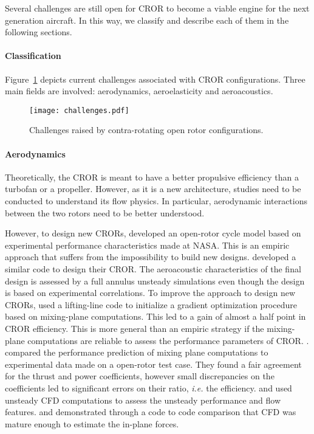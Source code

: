 
Several challenges are still open for CROR
to become a viable engine for the next generation aircraft.
In this way, we classify and describe each of them in the following sections.

\paragraph{Classification}
Figure~\ref{fig:cror_challenges} depicts current challenges associated
with CROR configurations. Three main fields are involved: aerodynamics,
aeroelasticity and aeroacoustics.
\begin{figure}[htbp]
  \centering
  \texttt{[image: challenges.pdf]}
  \caption{Challenges raised by contra-rotating open rotor configurations.}
  \label{fig:cror_challenges}
\end{figure}

\paragraph{Aerodynamics}
Theoretically, 
the CROR is meant to have a better propulsive efficiency than a turbofan or a
propeller. However, as it is a new architecture, studies need to be conducted
to understand its flow physics. In particular,
aerodynamic interactions between the two rotors need to be better understood.

However, to design new CRORs, 
\citet{Hendricks2011} developed an open-rotor cycle model based
on experimental performance characteristics made at NASA. This is 
an empiric approach that suffers from the impossibility to build new designs.
\citet{Peters2012} developed a similar code to design their CROR. The aeroacoustic
characteristics of the final design is assessed by a 
full annulus unsteady simulations even though the design is 
based on experimental correlations.
To improve the approach to design new CRORs, 
\citet{Bechet2011} used a lifting-line code to
initialize a gradient optimization procedure based on mixing-plane
computations. This led to a gain of almost a half point
in CROR efficiency. This is more general than an empiric strategy
if the mixing-plane computations are reliable to assess the performance
parameters of CROR. \citet{Zachariadis2011}.
compared the performance prediction of mixing plane computations
to experimental data made on a open-rotor test case.
They found a fair agreement for the thrust and power coefficients, however
small discrepancies on the coefficients led to significant errors on their ratio,
\emph{i.e.} the efficiency.
\citet{Vion2011} and \citet{Stuermer2008} used unsteady
CFD computations to assess the unsteady performance and flow features.
\citet{Stuermer2008} and \citet{Francois2013} demonstrated through a code to code comparison
that CFD was mature enough to estimate the in-plane forces.

